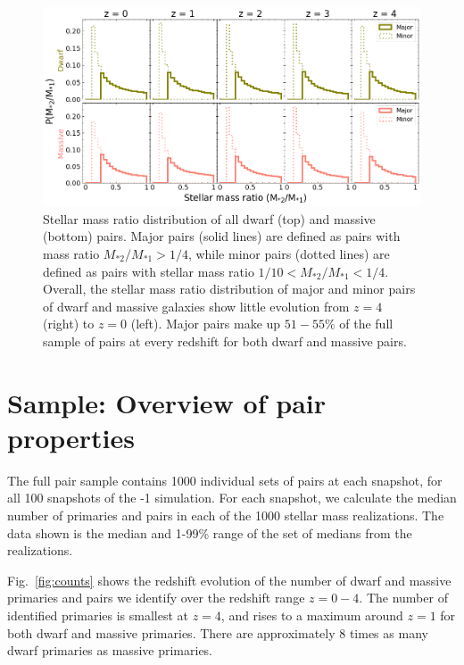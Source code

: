 \documentclass[twocolumn]{aastex631}
\newcommand{\ms}[1]{\ensuremath{M_{*{#1}}}}
\begin{document}
\begin{figure}[htb]
    \centering
    \includegraphics[width=\textwidth]{smrdist_1000.png}
    \caption{Stellar mass ratio distribution of all dwarf (top) and massive (bottom) pairs. Major pairs (solid lines) are defined as pairs with mass ratio $\ms{2}/\ms{1} > 1/4$, while minor pairs (dotted lines) are defined as pairs with stellar mass ratio $1/10<\ms{2}/\ms{1}<1/4$. Overall, the stellar mass ratio distribution of major and minor pairs of dwarf and massive galaxies show little evolution from $z=4$ (right) to $z=0$ (left). 
    Major pairs make up $51-55\%$ of the full sample of pairs at every redshift for both dwarf and massive pairs.}
    \label{fig:massratio}
\end{figure}

\section{Sample: Overview of pair properties} \label{sec:pairprops}
    The full pair sample contains 1000 individual sets of pairs at each snapshot, for all 100 snapshots of the -1 simulation. 
    For each snapshot, we calculate the median number of primaries and pairs in each of the 1000 stellar mass realizations. 
    The data shown is the median and 1-99\% range of the set of medians from the realizations.

    Fig.~\ref{fig:counts} shows the redshift evolution of the number of dwarf and massive primaries and pairs we identify over the redshift range $z=0-4$. 
    The number of identified primaries is smallest at $z=4$, and rises to a maximum around $z=1$ for both dwarf and massive primaries.        
    There are approximately 8 times as many dwarf primaries as massive primaries. 
    
\end{document}
